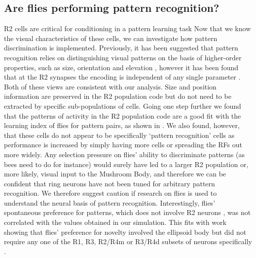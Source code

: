 \documentclass[10pt]{article}
\begin{document}
\subsection*{Are flies performing pattern recognition?}
R2 cells are critical for conditioning in a pattern learning task \cite{Pan2009} Now that we know the visual characteristics of these cells, we can investigate how pattern discrimination is implemented. Previously, it has been suggested that pattern recognition relies on distinguishing visual patterns on the basis of higher-order properties, such as size, orientation and elevation \cite{Pan2009,Ernst1999}, however it has been found that at the R2 synapses the encoding is independent of any single parameter \cite{Liu2006}. Both of these views are consistent with our analysis. Size and position information are preserved in the R2 population code but do not need to be extracted by specific sub-populations of cells. 
Going one step further we found that the patterns of activity in the R2 population code are a good fit with the learning index of flies for pattern pairs, as shown in \cite{Ernst1999}. We also found, however, that these cells do not appear to be specifically ‘pattern recognition’ cells as performance is increased by simply having more cells or spreading the RFs out more widely. Any selection pressure on flies’ ability to discriminate patterns (as bees need to do for instance) would surely have led to a larger R2 population or, more likely, visual input to the Mushroom Body, and therefore we can be confident that ring neurons have not been tuned for arbitrary pattern recognition. We therefore suggest caution if research on flies is used to understand the neural basis of pattern recognition.
Interestingly, flies’ spontaneous preference for patterns, which does not involve R2 neurons \cite{Ernst1999}, was not correlated with the values obtained in our simulation. This fits with work showing that flies’ preference for novelty involved the ellipsoid body but did not require any one of the R1, R3, R2/R4m or R3/R4d subsets of neurons specifically \cite{Solanki2015}. 
\end{document}
